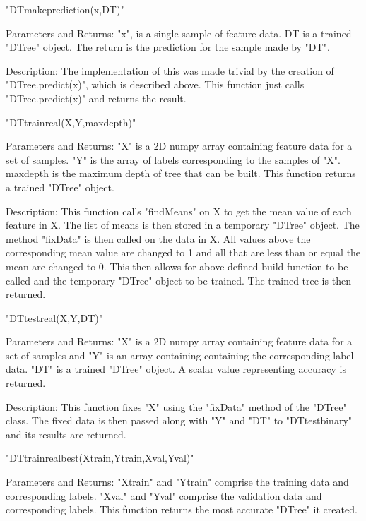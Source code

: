 \documentclass{article}
\begin{document}
\noindent "DT\textunderscore make\textunderscore prediction(x,DT)"

\indent Parameters and Returns: "x", is a single sample of feature data. DT is a trained "DTree" object. The return is the prediction for the sample made by "DT".

\indent Description: The implementation of this was made trivial by the creation of "DTree.predict(x)", which is described above. This function just calls "DTree.predict(x)" and returns the result.

\noindent "DT\textunderscore train\textunderscore real(X,Y,max\textunderscore depth)"

\indent Parameters and Returns: "X" is a 2D numpy array containing feature data for a set of samples. "Y" is the array of labels corresponding to the samples of "X". max\textunderscore depth is the maximum depth of tree that can be built. This function returns a trained "DTree" object.

\indent Description: This function calls "findMeans" on X to get the mean value of each feature in X. The list of means is then stored in a temporary "DTree" object. The method "fixData" is then called on the data in X. All values above the corresponding mean value are changed to 1 and all that are less than or equal the mean are changed to 0. This then allows for above defined build function to be called and the temporary "DTree" object to be trained. The trained tree is then returned.

\noindent "DT\textunderscore test\textunderscore real(X,Y,DT)"

\indent Parameters and Returns: "X" is a 2D numpy array containing feature data for a set of samples and "Y" is an array containing containing the corresponding label data. "DT" is a trained "DTree" object. A scalar value representing accuracy is returned.

\indent Description: This function fixes "X" using the "fixData" method of the "DTree" class. The fixed data is then passed along with "Y" and "DT" to "DT\textunderscore test\textunderscore binary" and its results are returned.

\noindent "DT\textunderscore train\textunderscore real\textunderscore best(X\textunderscore train,Y\textunderscore train,X\textunderscore val,Y\textunderscore val)"

\indent Parameters and Returns: "X\textunderscore train" and "Y\textunderscore train" comprise the training data and corresponding labels. "X\textunderscore val" and "Y\textunderscore val" comprise the validation data and corresponding labels. This function returns the most accurate "DTree" it created.
\end{document}
